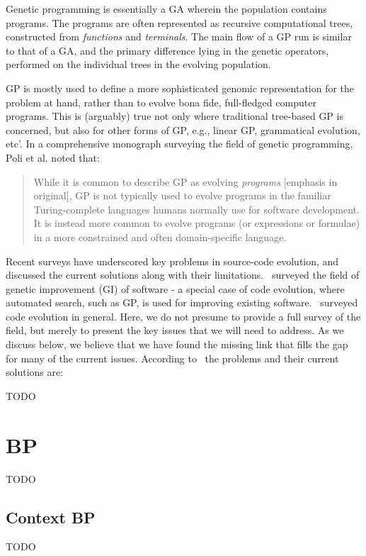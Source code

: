 \documentclass{article}
\begin{document}
    Genetic programming is essentially a GA wherein the population contains programs. The programs are often represented as recursive computational trees, constructed from \emph{functions} and \emph{terminals}. The main flow of a GP run is similar to that of a GA, and the primary difference lying in the genetic operators, performed on the individual trees in the evolving population.

    GP is mostly used to define a more sophisticated genomic representation for the problem at hand,
    rather than to evolve bona fide, full-fledged computer programs. This is (arguably) true not only where traditional
    tree-based GP is concerned, but also for other forms of GP, e.g., linear GP, grammatical evolution, etc'.
    In a comprehensive monograph surveying the field of genetic programming, Poli et al. noted that:

    \begin{quotation}
        While it is common to describe GP as evolving \emph{programs} [emphasis in original], GP is not typically used to evolve programs in the familiar Turing-complete languages humans normally use for software development. It is instead more common to evolve programs (or expressions or formulae) in a more constrained and often domain-specific language.
    \end{quotation}

    Recent surveys have underscored key problems in source-code evolution, and discussed the current
    solutions along with their limitations.~\cite{Petke2018} surveyed the field of genetic improvement (GI) of software -
    a special case of code evolution, where automated search, such as GP, is used for improving existing software.
    \cite{Banzhaf2018}~surveyed code evolution in general. Here, we do not presume to provide a full survey of the field,
    but merely to present the key issues that we will need to address. As we discuss below, we believe that we have found
    the missing link that fills the gap for many of the current issues. According to~\cite{Banzhaf2018, Petke2018}
    the problems and their current solutions are:

        {\Large TODO}

    \section{BP}
    {\Large TODO}

    \subsection{Context BP}
    {\large TODO}
\end{document}
